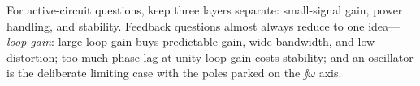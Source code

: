 \begin{exambox}
For active-circuit questions, keep three layers separate: small-signal gain,
power handling, and stability. Feedback questions almost always reduce to one
idea---\emph{loop gain}: large loop gain buys predictable gain, wide bandwidth,
and low distortion; too much phase lag at unity loop gain costs stability; and an
oscillator is the deliberate limiting case with the poles parked on the
\(\jj\omega\) axis.
\end{exambox}
